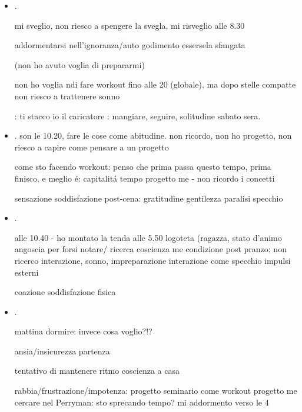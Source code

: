 \begin{itemize}
(dolore)
impulso chiedere:
situazione ce ne andiamo:

(interazioni immaginarie/essere me per situazione)


\item {}.

mi sveglio, non riesco a spengere la svegla, mi risveglio alle 8.30

addormentarsi nell'ignoranza/auto godimento essersela sfangata

(non ho avuto voglia di prepararmi)

non ho voglia ndi fare workout fino alle 20 (globale), ma dopo stelle compatte non riesco a trattenere sonno

: ti stacco io il caricatore
: mangiare, seguire, solitudine sabato sera.

\item {}.
 son le 10.20, fare le cose come abitudine. non ricordo, non ho progetto, non riesco a capire come pensare a un progetto

come sto facendo workout: penso che prima passa questo tempo, prima finisco, e meglio \'e: capitalit\'a tempo progetto me - non ricordo i concetti

sensazione soddisfazione post-cena: gratitudine gentilezza paralisi specchio 

\item {}.

alle 10.40 - ho montato la tenda alle 5.50
logoteta (ragazza, stato d'animo angoscia per forsi notare/ ricerca coscienza me
condizione post pranzo: non ricerco interazione, sonno, impreparazione interazione come specchio impulsi esterni

coazione soddisfazione fisica

\item {}.

mattina dormire: invece cosa voglio?!?

ansia/insicurezza partenza

tentativo di mantenere ritmo coscienza a casa

rabbia/frustrazione/impotenza: progetto seminario come workout progetto me
cercare nel Perryman: sto sprecando tempo?
mi addormento verso le 4


\end{itemize}
